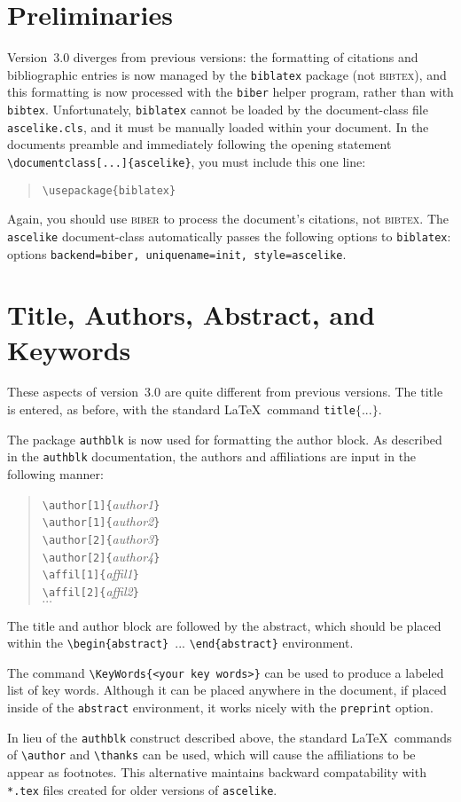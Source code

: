 \documentclass[Proceedings]{ascelike}
\begin{document}
\section{Preliminaries}\label{sec:prelim}
Version~3.0
diverges from previous versions:
the formatting of citations and bibliographic entries is now managed
by the \texttt{biblatex} package (not \textsc{bibtex}),
and this formatting is now processed with the \texttt{biber}
helper program, rather than with \texttt{bibtex}.
Unfortunately, \texttt{biblatex} cannot be loaded by the document-class
file \texttt{ascelike.cls}, and it must be 
manually loaded within your document.
In the documents preamble and immediately following the opening statement
\verb+\documentclass[...]{ascelike}+, you must include this one
line:
\begin{quote}
\verb+\usepackage{biblatex}+
\end{quote}
Again, you should use \textsc{biber} to process the document's citations,
not \textsc{bibtex}.
The \texttt{ascelike} document-class automatically passes the following
options to \texttt{biblatex}:
options \texttt{backend=biber, uniquename=init, style=ascelike}.
%
\section{Title, Authors, Abstract, and Keywords}\label{sec:title}
%
These aspects of version~3.0 are quite different from previous versions.
The title is entered, as before, with the standard \LaTeX\ command
\texttt{title$\{...\}$}.
\par
The package \texttt{authblk}
is now used for formatting the author block.
As described in the \texttt{authblk} documentation, the authors and
affiliations are input in the following manner:
\begin{quote}
  \verb+\author[1]{+\emph{author1}\verb+}+\\
  \verb+\author[1]{+\emph{author2}\verb+}+\\
  \verb+\author[2]{+\emph{author3}\verb+}+\\
  \verb+\author[2]{+\emph{author4}\verb+}+\\
  \verb+\affil[1]{+\emph{affil1}\verb+}+\\
  \verb+\affil[2]{+\emph{affil2}\verb+}+\\
  $\cdots$
\end{quote}
%
\par
The title and author block are followed by the abstract,
which should be
placed within the \verb+\begin{abstract}+~$...$ \verb+\end{abstract}+
environment.
%
\par
The command \verb+\KeyWords{<your key words>}+ can be used to produce
a labeled list of key words.  
Although it can be placed anywhere in the document,
if placed inside of the \texttt{abstract} environment,
it works nicely with the \texttt{preprint} option.
%
\par
In lieu of the \texttt{authblk} construct described above,
the standard \LaTeX\ commands of \verb+\author+
and \verb+\thanks+ can be used,
which will cause the affiliations to be appear as footnotes.
This alternative maintains backward compatability with \texttt{*.tex} files
created for older versions of \texttt{ascelike}.
%
\end{document}

